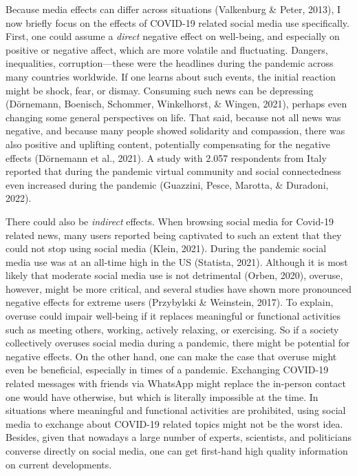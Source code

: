 \documentclass[
  man,mask]{apa6}
\begin{document}
Because media effects can differ across situations (Valkenburg \& Peter, 2013), I now briefly focus on the effects of COVID-19 related social media use specifically.
First, one could assume a \emph{direct} negative effect on well-being, and especially on positive or negative affect, which are more volatile and fluctuating.
Dangers, inequalities, corruption---these were the headlines during the pandemic across many countries worldwide.
If one learns about such events, the initial reaction might be shock, fear, or dismay.
Consuming such news can be depressing (Dörnemann, Boenisch, Schommer, Winkelhorst, \& Wingen, 2021), perhaps even changing some general perspectives on life.
That said, because not all news was negative, and because many people showed solidarity and compassion, there was also positive and uplifting content, potentially compensating for the negative effects (Dörnemann et al., 2021).
A study with 2.057 respondents from Italy reported that during the pandemic virtual community and social connectedness even increased during the pandemic (Guazzini, Pesce, Marotta, \& Duradoni, 2022).

There could also be \emph{indirect} effects.
When browsing social media for Covid-19 related news, many users reported being captivated to such an extent that they could not stop using social media (Klein, 2021).
During the pandemic social media use was at an all-time high in the US (Statista, 2021).
Although it is most likely that moderate social media use is not detrimental (Orben, 2020), overuse, however, might be more critical, and several studies have shown more pronounced negative effects for extreme users (Przybylski \& Weinstein, 2017).
To explain, overuse could impair well-being if it replaces meaningful or functional activities such as meeting others, working, actively relaxing, or exercising.
So if a society collectively overuses social media during a pandemic, there might be potential for negative effects.
On the other hand, one can make the case that overuse might even be beneficial, especially in times of a pandemic.
Exchanging COVID-19 related messages with friends via WhatsApp might replace the in-person contact one would have otherwise, but which is literally impossible at the time.
In situations where meaningful and functional activities are prohibited, using social media to exchange about COVID-19 related topics might not be the worst idea.
Besides, given that nowadays a large number of experts, scientists, and politicians converse directly on social media, one can get first-hand high quality information on current developments.
\end{document}
